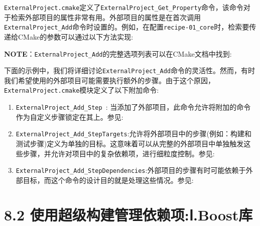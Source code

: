 \texttt{ExternalProject.cmake}定义了\texttt{ExternalProject\_Get\_Property}命令，该命令对于检索外部项目的属性非常有用。外部项目的属性是在首次调用\texttt{ExternalProject\_Add}命令时设置的。例如，在配置\texttt{recipe-01\_core}时，检索要传递给CMake的参数可以通过以下方法实现:


\begin{myInfoBox}
\textbf{NOTE}：\texttt{ExternalProject\_Add}的完整选项列表可以在CMake文档中找到:
\end{myInfoBox}


下面的示例中，我们将详细讨论\texttt{ExternalProject\_Add}命令的灵活性。然而，有时我们希望使用的外部项目可能需要执行额外的步骤。由于这个原因，\texttt{ExternalProject.cmake}模块定义了以下附加命令:

\begin{enumerate}
\item \texttt{ExternalProject\_Add\_Step }: 当添加了外部项目，此命令允许将附加的命令作为自定义步骤锁定在其上。参见:

\item \texttt{ExternalProject\_Add\_StepTargets}:允许将外部项目中的步骤(例如：构建和测试步骤)定义为单独的目标。这意味着可以从完整的外部项目中单独触发这些步骤，并允许对项目中的复杂依赖项，进行细粒度控制。参见:

\item \texttt{ExternalProject\_Add\_StepDependencies}:外部项目的步骤有时可能依赖于外部目标，而这个命令的设计目的就是处理这些情况。参见:

\end{enumerate}


\section{8.2 使用超级构建管理依赖项:Ⅰ.Boost库}

